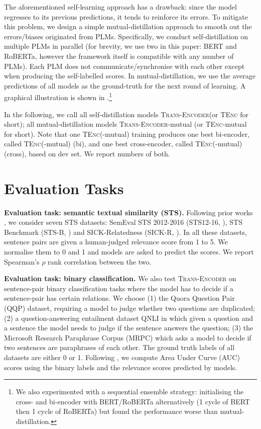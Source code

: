 \documentclass{article} \usepackage{iclr2021_conference,times}
\newcommand{\modelname}{\textsc{Trans-Encoder}\xspace}
\newcommand{\tenc}{\textsc{TEnc}\xspace}
\begin{document}
The aforementioned self-learning approach has a drawback: since the model regresses to its previous predictions, it tends to reinforce its errors. To mitigate this problem, we design a simple mutual-distillation approach to smooth out the errors/biases originated from PLMs. 
Specifically, we conduct self-distillation on multiple PLMs in parallel (for brevity, we use two in this paper: BERT and RoBERTa, however the framework itself is compatible with any number of PLMs). 
Each PLM does not communicate/synchronise with each other except when producing the self-labelled scores. In mutual-distillation, we use the average predictions of all models as the ground-truth for the next round of learning. A graphical illustration is shown in .\footnote{We also experimented with a sequential ensemble strategy: initialising the cross- and bi-encoder with BERT/RoBERTa alternatively (1 cycle of BERT then 1 cycle of RoBERTa) but found the performance worse than mutual-distillation.}

In the following, we call all self-distillation models \modelname (or \tenc for short); all mutual-distillation models \modelname-mutual (or \tenc-mutual for short). Note that one \tenc(-mutual) training produces one best bi-encoder, called \tenc(-mutual) (bi), and one best cross-encoder, called \tenc(-mutual) (cross), based on dev set. We report numbers of both.


\section{Evaluation Tasks}

\textbf{Evaluation task: semantic textual similarity (STS).} 
Following prior works \citep{reimers2019sentence,liu2021fast,gao2021simcse}, we consider seven STS datasets: SemEval STS 2012-2016 (STS12-16, \citealt{agirre2012semeval,agirre2013sem,agirre2014semeval,agirre2015semeval,agirre2016semeval}), STS Benchmark (STS-B, \citealt{cer2017semeval}) and SICK-Relatedness (SICK-R, \citealt{marelli2014sick}). 
In all these datasets, sentence pairs are given a human-judged relevance score from 1 to 5. 
We normalise them to 0 and 1 and models are asked to predict the scores. 
We report Spearman's $\rho$ rank correlation between the two.

\textbf{Evaluation task: binary classification.} 
We also test \modelname on sentence-pair binary classification tasks where the model has to decide if a sentence-pair has certain relations. 
We choose (1) the Quora Question Pair (QQP) dataset, requiring a model to judge whether two questions are duplicated; (2) a question-answering entailment dataset QNLI \citep{rajpurkar2016squad,wang2018glue} in which given a question and a sentence the model needs to judge if the sentence answers the question; (3) the Microsoft Research Paraphrase Corpus (MRPC) which asks a model to decide if two sentences are paraphrases of each other. The ground truth labels of all datasets are either 0 or 1. Following \citep{li-etal-2020-sentence,liu2021fast}, we compute Area Under Curve (AUC) scores using the binary labels and the relevance scores predicted by models.
\end{document}

